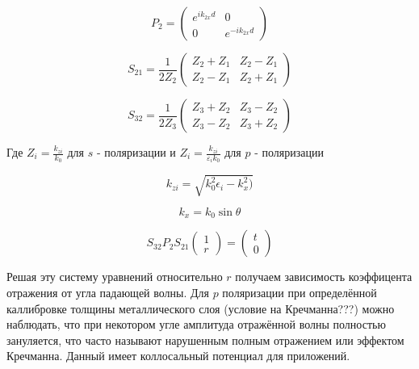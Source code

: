 $$P_{2}=\left(\begin{array}{cc}
e^{i k_{2 x} d} & 0 \\
0 & e^{-i k_{2 x} d}
\end{array}\right)$$



$$
S_{21} = 
\frac{1}{2 Z_2}\begin{pmatrix}
	Z_2+Z_1 & Z_2 -Z_1 \\
	Z_2-Z_1 & Z_2+Z_1
\end{pmatrix}
$$


$$
S_{32} = 
\frac{1}{2 Z_3}\begin{pmatrix}
Z_3+Z_2 & Z_3 -Z_2 \\
Z_3-Z_2 & Z_3+Z_2
\end{pmatrix}
$$

Где $Z_i = \frac{k_{zi}}{k_0}$ для $ s $ - поляризации и $Z_i = \frac{k_{zi}}{\varepsilon_i k_0}$ для $ p $ - поляризации 

$$
 k_{zi} = \sqrt{k_0^2 \epsilon_i - k_x^2)}
$$

$$
 k_{x} = k_0 \sin{ \theta}
$$


$$
S_{32} P_2 S_{21} \begin{pmatrix}
	1\\
	r 
\end{pmatrix} = 
\begin{pmatrix}
t\\
0 
\end{pmatrix}
$$


Решая эту систему уравнений относительно $ r $ получаем зависимость коэффицента отражения от угла падающей волны. Для $ p $ поляризации при определённой каллибровке толщины металлического слоя (условие на Кречманна???)
можно наблюдать, что при некотором угле амплитуда отражённой волны полностью зануляется, что часто называют нарушенным полным отражением или эффектом Кречманна.
Данный имеет коллосальный потенциал для приложений.





\begin{center}
	
\end{center}



